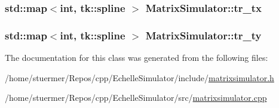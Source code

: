 \subsubsection[{\texorpdfstring{tr\+\_\+tx}{tr_tx}}]{\setlength{\rightskip}{0pt plus 5cm}std\+::map$<$int, tk\+::spline $>$ Matrix\+Simulator\+::tr\+\_\+tx\hspace{0.3cm}{\ttfamily [private]}}\hypertarget{class_matrix_simulator_aa544354356e00fe4da0edcb30f37e6b4}{}\label{class_matrix_simulator_aa544354356e00fe4da0edcb30f37e6b4}
\subsubsection[{\texorpdfstring{tr\+\_\+ty}{tr_ty}}]{\setlength{\rightskip}{0pt plus 5cm}std\+::map$<$int, tk\+::spline $>$ Matrix\+Simulator\+::tr\+\_\+ty\hspace{0.3cm}{\ttfamily [private]}}\hypertarget{class_matrix_simulator_a3d7f3962f4b2d2de111bc00539e0ba68}{}\label{class_matrix_simulator_a3d7f3962f4b2d2de111bc00539e0ba68}


The documentation for this class was generated from the following files\+:\begin{DoxyCompactItemize}
\item 
/home/stuermer/\+Repos/cpp/\+Echelle\+Simulator/include/\hyperlink{matrixsimulator_8h}{matrixsimulator.\+h}\item 
/home/stuermer/\+Repos/cpp/\+Echelle\+Simulator/src/\hyperlink{matrixsimulator_8cpp}{matrixsimulator.\+cpp}\end{DoxyCompactItemize}

